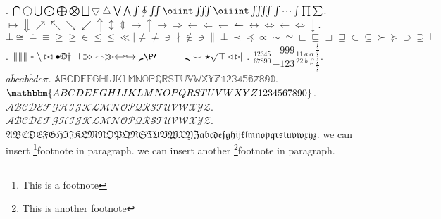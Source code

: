 \documentclass{ctexart}
\begin{document}
\lceil \lfloor \rfloor \langle \rangle \rightleftharpoons \).
\(\bigcap \bigcirc \bigcup \bigodot \bigoplus \bigotimes \bigsqcup
  \bigtriangledown \bigtriangleup \bigvee \bigwedge \int \oint \iint
\oiint \iiint \oiiint \iiiint \idotsint \prod \sum \).
\(\mapsto \Downarrow \nearrow \nwarrow \searrow \swarrow \Uparrow
  \updownarrow \Updownarrow \to \uparrow \rightarrow \Rightarrow
  \leftarrow \Leftarrow \leftharpoondown \leftharpoonup \leftrightarrow
\Leftrightarrow \gets \iff \downarrow \).
\(\bot \cong \doteq \equiv \ge \geq \in \le \leq \ll \mid \ne \neq
  \ni \nmid \notin \owns \parallel \perp \prec \preceq \propto \sim
  \simeq \sqsubset \sqsubseteq \sqsupset \sqsupseteq \subset \subseteq
\succ \succeq \supset \supseteq \vdash \).
\(\| \lVert \rVert \ast \backslash \bowtie \bullet \copyright \dagger
  \dashv \ddagger \diamond \frown \gg \hookleftarrow \hookrightarrow
  \lmoustache \P \prime \quad \qquad \rmoustache \smile \star \surd
\top \triangleleft \triangleright \lvert \rvert \).
\(\frac{12345}{67890} \dfrac{-999}{-123} \tfrac{11}{22} \frac{a}{b}
  \frac{\alpha}{\beta}
\frac{\frac{\frac{1}{2}}{\frac{3}{4}}}{\frac{\frac{5}{6}}{\frac{7}{8}}}\).
\(\overline{a} \overline{b} \overline{c} \overline{abcde}  \overline{\pi} \).
\(\mathbb{ABCDEFGHIJKLMNOPQRSTUVWXYZ1234567890} \).
\(\mathbbm{ABCDEFGHIJKLMNOPQRSTUVWXYZ1234567890} \).
\(\mathcal{ABCDEFGHIJKLMNOPQRSTUVWXYZ}\).
\(\mathscr{ABCDEFGHIJKLMNOPQRSTUVWXYZ}\).
\(\mathfrak{ABCDEFGHIJKLMNOPQRSTUVWXYZabcdefghijklmnopqrstuvwxyz}\).
we can insert \footnote{This is a footnote}{footnote} in paragraph.
we can insert another \footnote{This is another footnote}{footnote}
in paragraph.
\end{document}
